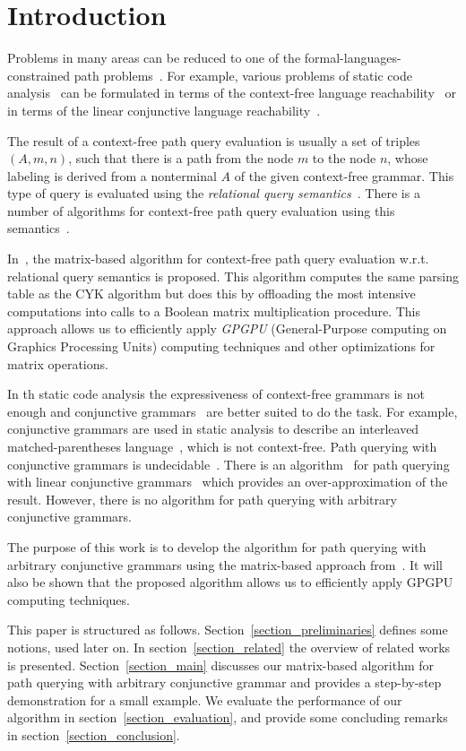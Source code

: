 \section{Introduction}

Problems in many areas can be reduced to one of the formal-languages-constrained path problems~\cite{barrett2000formal}. For example, various problems of static code analysis~\cite{bastani2015specification,xu2009scaling} can be formulated in terms of the context-free language reachability~\cite{reps1998program} or in terms of the linear conjunctive language reachability~\cite{zhang2017context}.

The result of a context-free path query evaluation is usually a set of triples \mbox{$(A, m, n)$}, such that there is a path from the node $m$ to the node $n$, whose labeling is derived from a nonterminal $A$ of the given context-free grammar. This type of query is evaluated using the \emph{relational query semantics}~\cite{hellingsRelational}. There is a number of algorithms for context-free path query evaluation using this semantics~\cite{azimov2018context,GLL,hellingsRelational,GraphQueryWithEarley,RDF}.

In~\cite{azimov2018context}, the matrix-based algorithm for context-free path query evaluation w.r.t. relational query semantics is proposed. This algorithm computes the same parsing table as the CYK algorithm but does this by offloading the most intensive computations into calls to a Boolean matrix multiplication procedure. This approach allows us to efficiently apply \emph{GPGPU} (General-Purpose computing on Graphics Processing Units) computing techniques and other optimizations for matrix operations.

In th static code analysis the expressiveness of context-free grammars is not enough and conjunctive grammars~\cite{okhotinConjAndBool} are better suited to do the task. For example, conjunctive grammars are used in static analysis to describe an interleaved matched-parentheses language~\cite{zhang2017context}, which is not context-free. Path querying with conjunctive grammars is undecidable~\cite{hellingsRelational}. There is an algorithm~\cite{zhang2017context} for path querying with linear conjunctive grammars~\cite{okhotinConjAndBool} which provides an over-approximation of the result. However, there is no algorithm for path querying with arbitrary conjunctive grammars.

The purpose of this work is to develop the algorithm
for path querying with arbitrary conjunctive grammars using the matrix-based approach from~\cite{azimov2018context}. It will also be shown that the proposed algorithm allows us to efficiently apply GPGPU computing techniques.

This paper is structured as follows. Section~\ref{section_preliminaries} defines some notions, used later on. In section~\ref{section_related} the overview of related works is presented. Section~\ref{section_main} discusses our matrix-based algorithm for path querying with arbitrary conjunctive grammar and provides a step-by-step demonstration for a small example. We evaluate the performance of our algorithm in section~\ref{section_evaluation}, and provide some concluding remarks in section~\ref{section_conclusion}.
